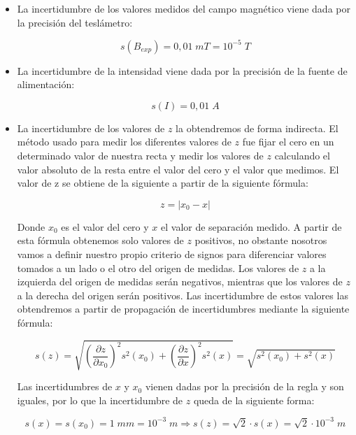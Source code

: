 \documentclass[a4paper,12pt,titlepage]{article}
\begin{document}
\begin{itemize}
    \item La incertidumbre de los valores medidos del campo magnético viene dada por la precisión del teslámetro:
    
    \begin{equation}
        s(B_{exp}) = 0,01\; mT = 10^{-5} \; T
        \label{Inc campo magnético}
    \end{equation}

    \item La incertidumbre de la intensidad viene dada por la precisión de la fuente de alimentación:
    
    \begin{equation}
        s(I) = 0,01 \; A
        \label{Inc intensidad}
    \end{equation}

    \item La incertidumbre de los valores de $z$ la obtendremos de forma indirecta. El método usado para medir los diferentes valores de $z$ fue fijar el cero en un determinado valor de nuestra recta y medir los valores de $z$ calculando el valor absoluto de la resta entre el valor del cero y el valor que medimos. El valor de z se obtiene de la siguiente a partir de la siguiente fórmula:
    
    \begin{equation}
        z = \vert x_0 - x \vert
        \label{Calculo de z}
    \end{equation}

    Donde $x_0$ es el valor del cero y $x$ el valor de separación medido. A partir de esta fórmula obtenemos solo valores de $z$ positivos, no obstante nosotros vamos a definir nuestro propio criterio de signos para diferenciar valores tomados a un lado o el otro del origen de medidas. Los valores de $z$ a la izquierda del origen de medidas serán negativos, mientras que los valores de $z$ a la derecha del origen serán positivos. Las incertidumbre de estos valores las obtendremos a partir de propagación de incertidumbres mediante la siguiente fórmula:

    \begin{equation}
        s(z) = \sqrt{\left (\frac{\partial z}{\partial x_0}\right )^2 s^2(x_0)  + \left (\frac{\partial z}{\partial x} \right )^2 s^2(x)} = \sqrt{s^2(x_0) + s^2(x)}
    \end{equation}

    Las incertidumbres de $x$ y $x_0$ vienen dadas por la precisión de la regla y son iguales, por lo que la incertidumbre de $z$ queda de la siguiente forma:

    \begin{equation}
        s(x) = s(x_0) = 1 \; mm = 10^{-3} \; m \Rightarrow s(z) = \sqrt{2} \cdot s(x) = \sqrt{2} \cdot 10^{-3} \; m
        \label{Inc z}
    \end{equation}
\end{itemize}
\end{document}
